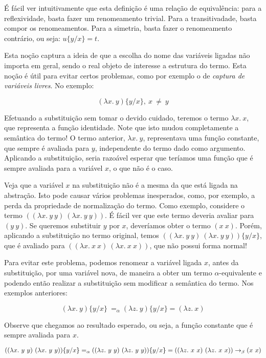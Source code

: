 É fácil ver intuitivamente que esta definição é uma relação de equivalência:
para a reflexividade, basta fazer um renomeamento trivial. Para a
transitivadade, basta compor os renomeamentos.  Para a simetria, basta fazer o
renomeamento contrário, ou seja: $ u\{y/x\} = t $.

Esta noção captura a ideia de que a escolha do nome das
variáveis ligadas não importa em geral, sendo o real objeto de interesse a
estrutura do termo. Esta noção é útil para evitar certos problemas, como por
exemplo o de \textit{captura de variáveis livres}. No exemplo:

\[ (\lambda x.\ y)\{y/x\},\ x\ \neq\ y \]

Efetuando a substituição sem tomar o devido cuidado, teremos o termo $\lambda
x.\ x$, que representa a função identidade. Note que isto mudou completamente a
semântica do termo! O termo anterior, $\lambda x.\ y$, representava uma função
constante, que sempre é avaliada para $y$, independente do termo dado como
argumento. Aplicando a substituição, seria razoável esperar que teríamos uma
função que é sempre avaliada para a variável $x$, o que não é o caso. 

Veja que a variável $x$ na substituição não é a mesma da que está ligada na
abstração. Isto pode causar vários problemas inesperados, como, por exemplo, a
perda da propriedade de normalização do termo.  Como exemplo, considere o termo
$((\lambda x.\ y\ y)\ (\lambda x.\ y\ y))$. É fácil ver que este termo deveria
avaliar para $(y\ y)$. Se queremos substituir $y$ por $x$, deveríamos obter o
termo $(x\ x)$.  Porém, aplicando a substituição no termo original, temos
$((\lambda x.\ y\ y)\ (\lambda x.\ y\ y))\{y/x\}$, que é avaliado para
$((\lambda x.\ x\ x)\ (\lambda x.\ x\ x))$, que não possui forma normal!

Para evitar este problema, podemos renomear a variável ligada $x$, antes da
substituição, por uma variável nova, de maneira a obter um termo
$\alpha$-equivalente e podendo então realizar a substituição sem modificar a
semântica do termo. Nos exemplos anteriores:

\[ (\lambda x.\ y)\{y/x\}\ =_{\alpha} (\lambda z.\ y)\{y/x\} = (\lambda z.\ x) \]

Observe que chegamos ao resultado esperado, ou seja, a função constante que é
sempre avaliada para $x$.

\[ ((\lambda x.\ y\ y)\ (\lambda x.\ y\ y))\{y/x\} =_{\alpha} ((\lambda z.\ y\
    y)\ (\lambda z.\ y\ y))\{y/x\} \\
    = ((\lambda z.\ x\ x)\ (\lambda z.\ x\ x)) \rightarrow_{\beta} (x\ x)\]

